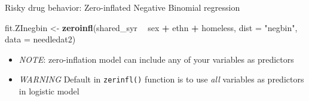 \documentclass[
  ignorenonframetext,
]{beamer}
\newenvironment{Shaded}{\begin{snugshade}}{\end{snugshade}}
\newcommand{\DataTypeTok}[1]{\textcolor[rgb]{0.13,0.29,0.53}{#1}}
\newcommand{\KeywordTok}[1]{\textcolor[rgb]{0.13,0.29,0.53}{\textbf{#1}}}
\newcommand{\NormalTok}[1]{#1}
\newcommand{\OperatorTok}[1]{\textcolor[rgb]{0.81,0.36,0.00}{\textbf{#1}}}
\newcommand{\StringTok}[1]{\textcolor[rgb]{0.31,0.60,0.02}{#1}}
\providecommand{\tightlist}{%
  \setlength{\itemsep}{0pt}\setlength{\parskip}{0pt}}
\begin{document}
\begin{frame}[fragile]{Risky drug behavior: Zero-inflated Negative
Binomial regression}
\protect\hypertarget{risky-drug-behavior-zero-inflated-negative-binomial-regression}{}

\begin{Shaded}
\begin{Highlighting}[]
\NormalTok{fit.ZInegbin <-}\StringTok{ }\KeywordTok{zeroinfl}\NormalTok{(shared_syr }\OperatorTok{~}\StringTok{ }\NormalTok{sex }\OperatorTok{+}\StringTok{ }\NormalTok{ethn }\OperatorTok{+}\StringTok{ }\NormalTok{homeless,}
                         \DataTypeTok{dist =} \StringTok{"negbin"}\NormalTok{,}
                         \DataTypeTok{data =}\NormalTok{ needledat2)}
\end{Highlighting}
\end{Shaded}

\begin{itemize}
\tightlist
\item
  \emph{NOTE}: zero-inflation model can include any of your variables as
  predictors
\item
  \emph{WARNING} Default in \texttt{zerinfl()} function is to use
  \emph{all} variables as predictors in logistic model
\end{itemize}

\end{frame}
\end{document}

